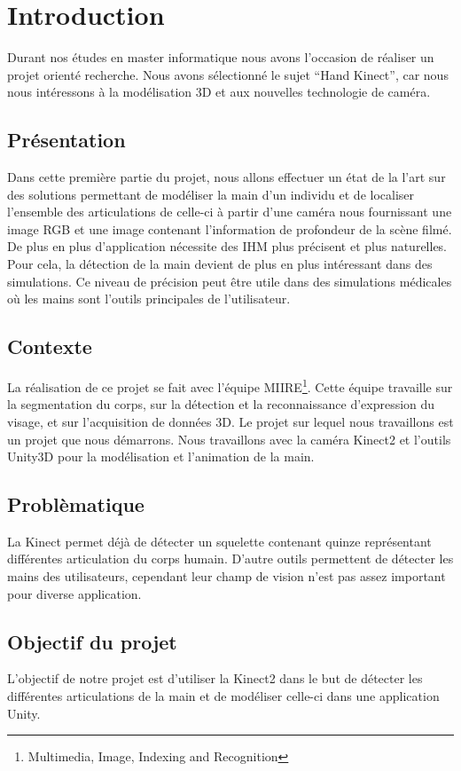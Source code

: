 \section{Introduction}

Durant nos études en master informatique nous avons l'occasion de réaliser un projet
orienté recherche. Nous avons sélectionné le sujet \enquote{Hand Kinect}, car nous nous
intéressons à la modélisation 3D et aux nouvelles technologie de caméra.

\subsection{Présentation}
Dans cette première partie du projet, nous allons effectuer un état de la l'art sur des solutions
permettant de modéliser la main d'un individu et de localiser l'ensemble des articulations de celle-ci 
à partir d'une caméra nous fournissant une image RGB et une image contenant l'information de profondeur de la scène filmé.\\

De plus en plus d'application nécessite des IHM plus précisent et plus naturelles. Pour cela, la détection
de la main devient de plus en plus intéressant dans des simulations. Ce niveau de précision peut être
utile dans des simulations médicales où les mains sont l'outils principales de l'utilisateur.\\

\subsection{Contexte}
La réalisation de ce projet se fait avec l'équipe MIIRE\footnote{Multimedia, Image, Indexing and Recognition}. Cette équipe travaille sur la segmentation du corps, sur la détection et la
reconnaissance d'expression du visage, et sur l'acquisition de données 3D.
Le projet sur lequel nous travaillons est un projet que nous démarrons. Nous travaillons avec la caméra
Kinect2 et l'outils Unity3D pour la modélisation et l'animation de la main.

\subsection{Problèmatique}
La Kinect permet déjà de détecter un squelette contenant quinze représentant différentes articulation 
du corps humain. 
D'autre outils permettent de détecter les mains des utilisateurs, cependant leur
champ de vision n'est pas assez important pour diverse application.

\subsection{Objectif du projet}
L'objectif de notre projet est d'utiliser la Kinect2 dans le but de détecter les différentes articulations
de la main et de modéliser celle-ci dans une application Unity.
